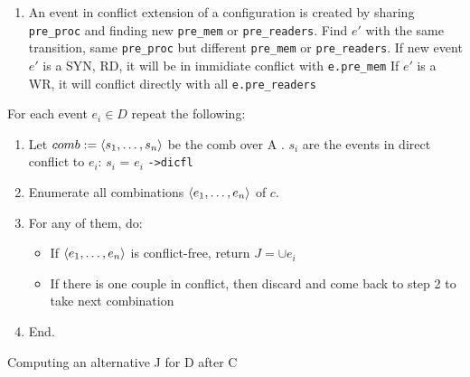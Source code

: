\documentclass{llncs}
\begin{document}
\begin{enumerate}
	\item
		An event in conflict extension of a configuration is created by sharing \verb!pre_proc! and finding
		new \verb!pre_mem! or \verb!pre_readers!.
		Find $e'$ with the same transition, same \verb!pre_proc! but different \verb!pre_mem! or \verb!pre_readers!.
		If new event $e'$ is a SYN, RD, it will be in immidiate conflict with \verb!e.pre_mem!
		If $e'$ is a WR, it will conflict directly with all \verb!e.pre_readers!		
\end{enumerate}


\begin{algorithm}
\noindent
For each event $e_i \in D$ repeat the following:
\begin{enumerate}
\item
	Let $comb \mathrel{:=} \langle s_1, \ldots, s_n\rangle$ be the comb over A . 
	$s_i$ are the events in direct conflict to $e_i$: $s_i$ = $e_i$ \verb!->dicfl!

\item
	Enumerate all combinations $\langle e_1, \ldots, e_n\rangle$ of $c$.
\item
	For any of them, do:
	\begin{itemize}
		\item 
    		If $\langle e_1, \ldots, e_n\rangle$ is conflict-free, return $J = \cup e_i$ 
    	\item
		    If there is one couple in conflict, then discard and come back to step 2 to take next combination
	\end{itemize}
\item End.
\end{enumerate}
\caption{Computing an alternative J for D after C}
\label{a:alter}
\end{algorithm}
\end{document}
